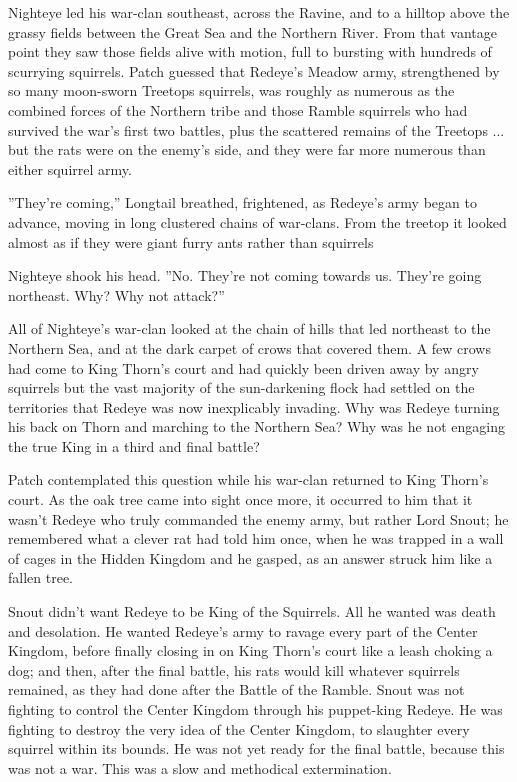 \documentclass[12pt]{book}
\begin{document}
Nighteye led his war-clan southeast, across the Ravine, and to a hilltop above the grassy fields between the Great Sea and the Northern River. From that vantage point they saw those fields alive with motion, full to bursting with hundreds of scurrying squirrels. Patch guessed that Redeye's Meadow army, strengthened by so many moon-sworn Treetops squirrels, was roughly as numerous as the combined forces of the Northern tribe and those Ramble squirrels who had survived the war's first two battles, plus the scattered remains of the Treetops ... but the rats were on the enemy's side, and they were far more numerous than either squirrel army.

''They're coming,'' Longtail breathed, frightened, as Redeye's army began to advance, moving in long clustered chains of war-clans. From the treetop it looked almost as if they were giant furry ants rather than squirrels

Nighteye shook his head. ''No. They're not coming towards us. They're going northeast. Why? Why not attack?''

All of Nighteye's war-clan looked at the chain of hills that led northeast to the Northern Sea, and at the dark carpet of crows that covered them. A few crows had come to King Thorn's court %
and had quickly been driven away by angry squirrels %
but the vast majority of the sun-darkening flock had settled on the territories that Redeye was now inexplicably invading. Why was Redeye turning his back on Thorn and marching to the Northern Sea? Why was he not engaging the true King in a third and final battle?

Patch contemplated this question while his war-clan returned to King Thorn's court. As the oak tree came into sight once more, it occurred to him that it wasn't Redeye who truly commanded the enemy army, but rather Lord Snout; he remembered what a clever rat had told him once, when he was trapped in a wall of cages in the Hidden Kingdom %
and he gasped, as an answer struck him like a fallen tree.

Snout didn't want Redeye to be King of the Squirrels. All he wanted was death and desolation. He wanted Redeye's army to ravage every part of the Center Kingdom, before finally closing in on King Thorn's court like a leash choking a dog; and then, after the final battle, his rats would kill whatever squirrels remained, as they had done after the Battle of the Ramble. Snout was not fighting to control the Center Kingdom through his puppet-king Redeye. He was fighting to destroy the very idea of the Center Kingdom, to slaughter every squirrel within its bounds. He was not yet ready for the final battle, because this was not a war. This was a slow and methodical extermination.
\end{document}
